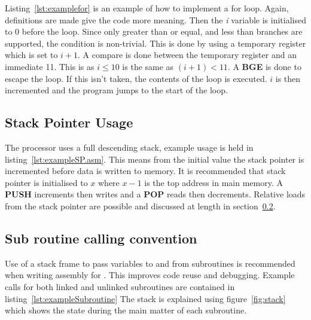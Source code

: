 

Listing~\ref{lst:examplefor} is an example of how to implement a for loop. 
Again, definitions are made give the code more meaning. 
Then the \textit{i} variable is initialised to 0 before the loop. 
Since only greater than or equal, and less than branches are supported, the condition is non-trivial.
This is done by using a temporary register which is set to $i + 1$. 
A compare is done between the temporary register and an immediate 11.
This is as $i \leq 10$ is the same as $(i+1) < 11$. 
A \textbf{BGE} is done to escape the loop. 
If this isn't taken, the contents of the loop is executed.
$i$ is then incremented and the program jumps to the start of the loop. 



\subsection{Stack Pointer Usage}

The \samurai{} processor uses a full descending stack, example usage is held in listing~\ref{lst:exampleSP.asm}.
This means from the initial value the stack pointer is incremented before data is written to memory.
It is recommended that stack pointer is initialised to $x$ where $x-1$ is the top address in main memory. 
A \textbf{PUSH} increments then writes and a \textbf{POP} reads then decrements.
Relative loads from the stack pointer are possible and discussed at length in section~\ref{sec:subroutine_calls}.


\subsection{Sub routine calling convention}
\label{sec:subroutine_calls}

Use of a stack frame to pass variables to and from subroutines is recommended when writing assembly for \samurai{}.
This improves code reuse and debugging. 
Example calls for both linked and unlinked subroutines are contained in listing~\ref{lst:exampleSubroutine}
The stack is explained using figure~\ref{fig:stack} which shows the state during the main matter of each subroutine.

